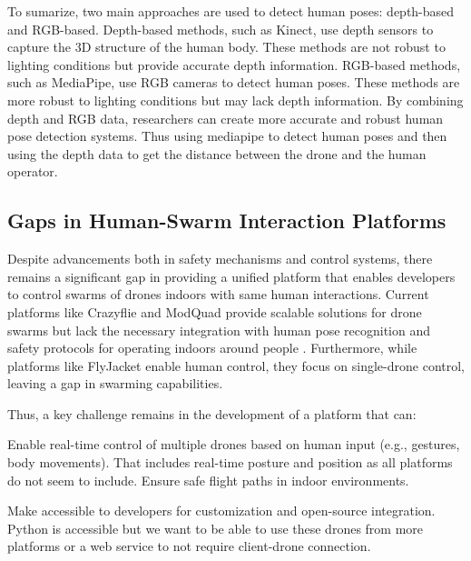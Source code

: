 To sumarize, two main approaches are used to detect human poses: depth-based and RGB-based. Depth-based methods, such as Kinect, use depth sensors to capture the 3D structure of the human body. These methods are not robust to lighting conditions but provide accurate depth information. RGB-based methods, such as MediaPipe, use RGB cameras to detect human poses. These methods are more robust to lighting conditions but may lack depth information. By combining depth and RGB data, researchers can create more accurate and robust human pose detection systems. Thus using mediapipe to detect human poses and then using the depth data to get the distance between the drone and the human operator.

\subsection{Gaps in Human-Swarm Interaction Platforms}
Despite advancements both in safety mechanisms and control systems, there remains a significant gap in providing a unified platform that enables developers to control swarms of drones indoors with same human interactions. Current platforms like Crazyflie and ModQuad provide scalable solutions for drone swarms but lack the necessary integration with human pose recognition and safety protocols for operating indoors around people \cite{crazyflie, modquad}. Furthermore, while platforms like FlyJacket enable human control, they focus on single-drone control, leaving a gap in swarming capabilities. 

Thus, a key challenge remains in the development of a platform that can:

    Enable real-time control of multiple drones based on human input (e.g., gestures, body movements).
    That includes real-time posture and position as all platforms do not seem to include. \cite{bitcraze_cflib, noauthor_overview_nodate, flyjacket}
    Ensure safe flight paths in indoor environments.

    Make accessible to developers for customization and open-source integration.
        Python is accessible but we want to be able to use these drones from more platforms or a web service to not require client-drone connection.
	
\pagebreak
